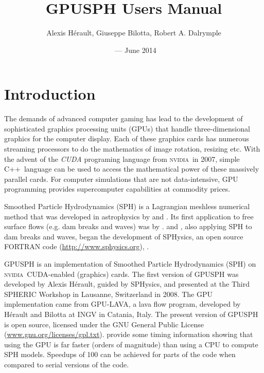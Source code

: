\documentclass[12pt]{memoir}
\title{GPUSPH Users Manual}
\author{Alexis Hérault, Giuseppe Bilotta, Robert A. Dalrymple}
\date{\currentver\ --- June 2014}
\newcommand{\nvidia}{\textsc{nvidia}}
\newcommand{\cpp}{{\sffamily C\ttfamily++}}
\begin{document}
\maketitle
\tableofcontents

\chapter{Introduction}


The demands of advanced computer gaming has lead to the development of
sophisticated graphics processing units (GPUs) that handle
three-dimensional graphics for the computer display. Each of these
graphics cards has numerous streaming processors to do the mathematics
of image rotation, resizing etc. With the advent of the {\em CUDA}
programing language from \nvidia\ in 2007, simple \cpp\ language can be used
to access the mathematical power of these massively parallel cards. For
computer simulations that are not data-intensive, GPU programming
provides supercomputer capabilities at commodity prices.

Smoothed Particle Hydrodynamics (SPH) is a Lagrangian meshless numerical
method that was developed in astrophysics by \cite{lucy_numerical_1977} and
\cite{gingold_smoothed_1977}. Its first application to free surface flows (e.g.
dam breaks and waves) was by \cite{monaghan_volcanoes_1994}.
\cite{gomez-gesteira_using_2004} and \cite{dalrymple_numerical_2006}, also
applying SPH to dam breaks and waves, began the development of SPHysics,
an open source FORTRAN code (\url{http://www.sphysics.org}),
\cite{gomez-gesteira_sphysics_2012}.

GPUSPH is an implementation of Smoothed Particle Hydrodynamics (SPH) on
\nvidia\ CUDA-enabled (graphics) cards. The first version of GPUSPH was
developed by Alexis Hérault, guided by SPHysics, and presented at the
Third SPHERIC Workshop in Lausanne, Switzerland in 2008. The GPU
implementation came from GPU-LAVA, a lava flow program, developed by
Hérault and Bilotta at INGV in Catania, Italy. The present version of
GPUSPH is open source, licensed under the GNU General Public License
(\url{www.gnu.org/licenses/gpl.txt}). \cite{herault_sph_2010} provide
some timing information showing that using the GPU is far faster (orders
of magnitude) than using a CPU to compute SPH models. Speedups of 100
can be achieved for parts of the code when compared to serial versions
of the code.
\end{document}
